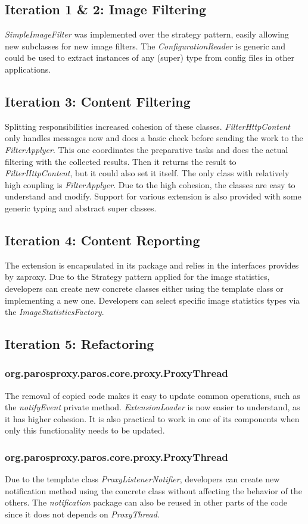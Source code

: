 \subsection{Iteration 1 \& 2: Image Filtering}
\textit{SimpleImageFilter} was implemented over the strategy pattern, easily allowing new subclasses for new image filters.
The \textit{ConfigurationReader} is generic and could be used to extract instances of any (super) type from config files in other applications.

\subsection{Iteration 3: Content Filtering}
Splitting responsibilities increased cohesion of these classes. \textit{FilterHttpContent} only handles messages now and does a basic check before sending the work to the \textit{FilterApplyer}. This one coordinates the preparative tasks and does the actual filtering with the collected results. Then it returns the result to \textit{FilterHttpContent}, but it could also set it itself.
The only class with relatively high coupling is \textit{FilterApplyer}.
Due to the high cohesion, the classes are easy to understand and modify. Support for various extension is also provided with some generic typing and abstract super classes.
\subsection{Iteration 4: Content Reporting}
The extension is encapsulated in its package and relies in the interfaces provides by zaproxy. Due to the Strategy pattern applied for the image statistics, developers can create new concrete classes either using the template class or implementing a new one. Developers can select specific image statistics types via the \textit{ImageStatisticsFactory}.

\subsection{Iteration 5: Refactoring}
\subsubsection{org.parosproxy.paros.core.proxy.ProxyThread}
The removal of copied code makes it easy to update common operations, such as the \textit{notifyEvent} private method.
\textit{ExtensionLoader} is now easier to understand, as it has higher cohesion. It is also practical to work in one of its components when only this functionality needs to be updated.
\subsubsection{org.parosproxy.paros.core.proxy.ProxyThread}

Due to the template class \textit{ProxyListenerNotifier}, developers can create new notification method using the concrete class without affecting the behavior of the others. The \textit{notification} package can also be reused in other parts of the code since it does not depends on \textit{ProxyThread}. 
